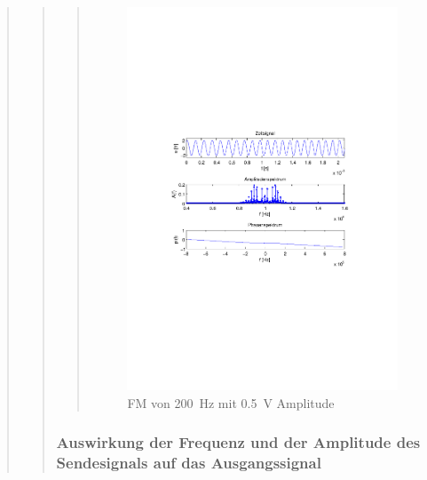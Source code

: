 \begin{quote}
\begin{quote}
\begin{quote}
            \begin{figure}[H]
            \centering
                \includegraphics[scale=0.7, trim = 35mm 100mm 35mm 95mm, clip]{Bilder/f200_05}
                    \caption{FM von \SI{200}{\hertz} mit \SI{0,5}{\volt} Amplitude}
                    \label{fig:f100_2}
            \end{figure}
            
        \end{quote}

        
        
        \subsubsection{Auswirkung der Frequenz und der Amplitude des Sendesignals auf das Ausgangssignal}
        \begin{quote}
            

\end{quote}
\end{quote}
\end{quote}

